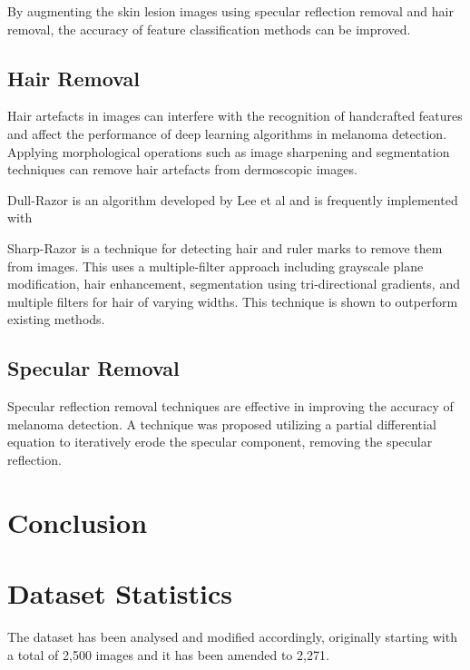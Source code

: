 By augmenting the skin lesion images using specular reflection removal and hair removal, the accuracy of feature classification methods can be improved\cite{kasmi2023}.

\subsection{Hair Removal}
Hair artefacts in images can interfere with the recognition of handcrafted features and affect the performance of deep learning algorithms in melanoma detection\cite{kasmi2023}. Applying morphological operations such as image sharpening and segmentation techniques can remove hair artefacts from dermoscopic images\cite{kasmi2023}.

Dull-Razor is an algorithm developed by Lee et al\cite{Lee1997} and is frequently implemented with

Sharp-Razor\cite{kasmi2023} is a technique for detecting hair and ruler marks to remove them from images. This uses a multiple-filter approach including grayscale plane modification, hair enhancement, segmentation using tri-directional gradients, and multiple filters for hair of varying widths. This technique is shown to outperform existing methods.

\subsection{Specular Removal}
Specular reflection removal techniques are effective in improving the accuracy of melanoma detection\cite{Shen2009}. A technique was proposed utilizing a partial differential equation to iteratively erode the specular component, removing the specular reflection\cite{Shen2009}.


\section{Conclusion}



\section{Dataset Statistics}
The dataset has been analysed and modified accordingly, originally starting with a total of 2,500 images and it has been amended to 2,271.


